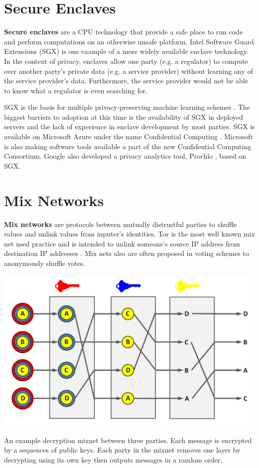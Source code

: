 \documentclass[nobib]{tufte-handout}
\begin{document}
\section{Secure Enclaves}

\textbf{Secure enclaves} are a CPU technology that provide a safe place to run
code and perform computations on an otherwise unsafe platform. Intel Software
Guard Extensions (SGX) \cite{intel-sgx} is one example of a more widely
available enclave technology. In the context of privacy, enclaves allow one
party (e.g. a regulator) to compute over another party’s private data (e.g. a
service provider) without learning any of the service provider’s data.
Furthermore, the service provider would not be able to know what a regulator is
even searching for.

SGX is the basis for multiple privacy-preserving machine learning schemes
\cite{DBLP:conf/eurosp/ChengZKHHJJ0S19,tramer2018slalom,DBLP:journals/corr/abs-1803-05961}.
The biggest barriers to adoption at this time is the availability of SGX in
deployed servers and the lack of experience in enclave development by most
parties. SGX is available on Microsoft Azure under the name Confidential
Computing \cite{azure-confidential-computing}.  Microsoft is also making
software tools available a part of the new Confidential Computing Consortium.
Google also developed a privacy analytics tool, Prochlo \cite{prochlo}, based on
SGX.

\section{Mix Networks}

\textbf{Mix networks} \cite{DBLP:journals/cacm/Chaum81} are protocols between
mutually distrustful parties to shuffle values and unlink values from inputer’s
identities. Tor is the most well known mix net used practice and is intended to
unlink someone's source IP address from destination IP addresses
\cite{DBLP:conf/uss/DingledineMS04}. Mix nets also are often proposed in voting
schemes to anonymously shuffle votes.

\begin{marginfigure} \includegraphics[width=\linewidth]{mixnet}
\caption{An example decryption mixnet between three parties. Each message is
encrypted by a sequences of public keys. Each party in the mixnet removes one
layer by decrypting using its own key then outputs messages in a random order.}
\label{fig:mixnet} \end{marginfigure}
\end{document}
